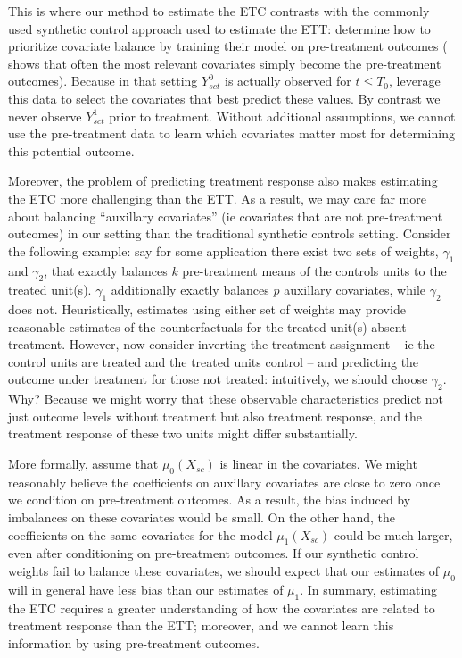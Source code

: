 \documentclass[12pt]{article}
\begin{document}
This is where our method to estimate the ETC contrasts with the commonly used synthetic control approach used to estimate the ETT: \cite{abadie2010synthetic} determine how to prioritize covariate balance by training their model on pre-treatment outcomes (\cite{kaul2015synthetic} shows that often the most relevant covariates simply become the pre-treatment outcomes). Because in that setting $Y^0_{sct}$ is actually observed for $t \le T_0$, \cite{abadie2010synthetic} leverage this data to select the covariates that best predict these values. By contrast we never observe $Y^1_{sct}$ prior to treatment. Without additional assumptions, we cannot use the pre-treatment data to learn which covariates matter most for determining this potential outcome.

Moreover, the problem of predicting treatment response also makes estimating the ETC more challenging than the ETT. As a result, we may care far more about balancing ``auxillary covariates'' (ie covariates that are not pre-treatment outcomes) in our setting than the traditional synthetic controls setting. Consider the following example: say for some application there exist two sets of weights, $\gamma_1$ and $\gamma_2$, that exactly balances $k$ pre-treatment means of the controls units to the treated unit(s). $\gamma_1$ additionally exactly balances $p$ auxillary covariates, while $\gamma_2$ does not. Heuristically, estimates using either set of weights may provide reasonable estimates of the counterfactuals for the treated unit(s) absent treatment. However, now consider inverting the treatment assignment -- ie the control units are treated and the treated units control -- and predicting the outcome under treatment for those not treated: intuitively, we should choose $\gamma_2$. Why? Because we might worry that these observable characteristics predict not just outcome levels without treatment but also treatment response, and the treatment response of these two units might differ substantially. 

More formally, assume that $\mu_0(X_{sc})$ is linear in the covariates. We might reasonably believe the coefficients on auxillary covariates are close to zero once we condition on pre-treatment outcomes. As a result, the bias induced by imbalances on these covariates would be small. On the other hand, the coefficients on the same covariates for the model $\mu_1(X_{sc})$ could be much larger, even after conditioning on pre-treatment outcomes. If our synthetic control weights fail to balance these covariates, we should expect that our estimates of $\mu_0$ will in general have less bias than our estimates of $\mu_1$. In summary, estimating the ETC requires a greater understanding of how the covariates are related to treatment response than the ETT; moreover, and we cannot learn this information by using pre-treatment outcomes.
\end{document}
